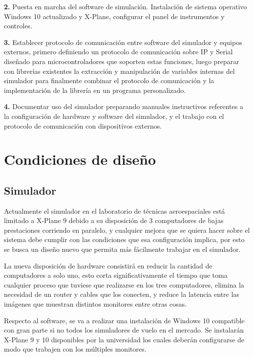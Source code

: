 \textbf{2.} Puesta en marcha del software de simulación. Instalación de sistema operativo Windows 10 actualizado y X-Plane, configurar el panel de instrumentos y controles.

\textbf{3.} Establecer protocolo de comunicación entre software del simulador y equipos externos, primero definiendo un protocolo de comunicación sobre IP y Serial diseñado para microcontroladores que soporten estas funciones, luego preparar con librerías existentes la extracción y manipulación de variables internas del simulador para finalmente combinar el protocolo de comunicación y la implementación de la librería en un programa personalizado.

\textbf{4.} Documentar uso del simulador preparando manuales instructivos referentes a la configuración de hardware y software del simulador, y el trabajo con el protocolo de comunicación con dispositivos externos.

\section{Condiciones de diseño}

\subsection{Simulador}

Actualmente el simulador en el laboratorio de técnicas aeroespaciales está limitado a X-Plane 9 debido a su disposición de 3 computadores de bajas prestaciones corriendo en paralelo, y cualquier mejora que se quiera hacer sobre el sistema debe cumplir con las condiciones que esa configuración implica, por esto se busca un diseño nuevo que permita más fácilmente trabajar en el simulador. 

La nueva disposición de hardware consistirá en reducir la cantidad de computadores a solo uno, esto corta significativamente el tiempo que toma cualquier proceso que tuviese que realizarse en los tres computadores, elimina la necesidad de un router y cables que los conecten, y reduce la latencia entre las imágenes que muestran distintos monitores entre otras cosas.

Respecto al software, se va a realizar una instalación de Windows 10 compatible con gran parte si no todos los simuladores de vuelo en el mercado. Se instalarán X-Plane 9 y 10 disponibles por la universidad los cuales deberán configurarse de modo que trabajen con los múltiples monitores.

